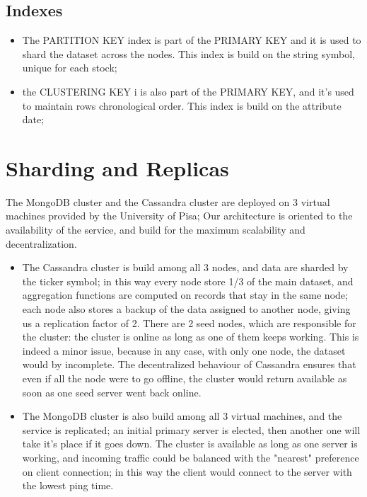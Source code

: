 \subsection{Indexes}
\begin{itemize}
    \item 
The PARTITION KEY index is part of the PRIMARY KEY and it is used to shard the dataset across
the nodes. This index is build on the string symbol, unique for each stock;
    \item
the CLUSTERING KEY i is also part of the PRIMARY KEY, and it's used to maintain rows 
chronological order. This index is build on the attribute date;
\end{itemize}
\section{Sharding and Replicas}
The MongoDB cluster and the Cassandra cluster are deployed on 3 virtual machines provided
by the University of Pisa; 
Our architecture is oriented to the availability of the service, and build for the maximum
scalability and decentralization.
\begin{itemize}
    \item 
The Cassandra cluster is build among all 3 nodes, and data are sharded by the ticker symbol;
in this way every node store 1/3 of the main dataset, and aggregation functions are computed
on records that stay in the same node; each node also stores a backup of the data
assigned to another node, giving us a replication factor of 2. There are 2 seed nodes,
which are responsible for the cluster: the cluster is online as long as one of them keeps
working. This is indeed a minor issue, because in any case, with only one node, the dataset 
would by incomplete. The decentralized behaviour of Cassandra ensures that
even if all the node were to go offline, the cluster would return available as soon as one seed server went back
online. 
    \item
The MongoDB cluster is also build among all 3 virtual machines, and the service is replicated;
an initial primary server is elected, then another one will take it's place if it goes down. 
The cluster is available as long as one server is working, and incoming traffic could be balanced
with the "nearest" preference on client connection; in this way the client would connect to the
server with the lowest ping time.

\end{itemize}
